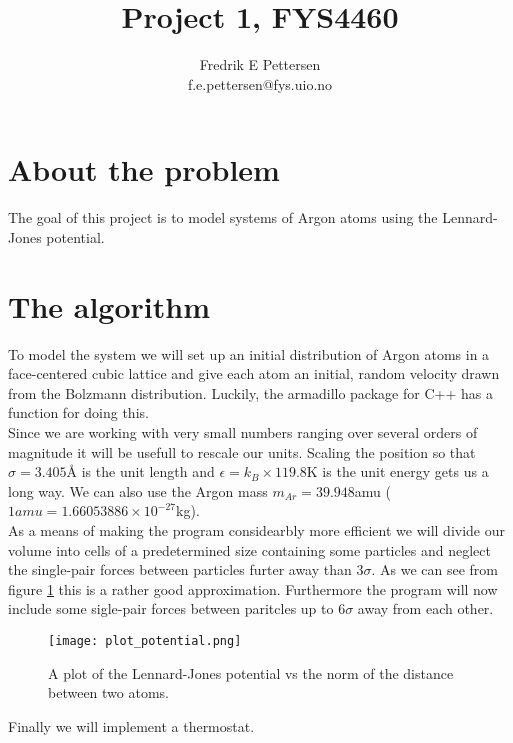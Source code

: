 \documentclass[a4paper,english, 10pt, twoside]{article}
\title{Project 1, FYS4460}
\author{Fredrik E Pettersen\\ f.e.pettersen@fys.uio.no}
\begin{document}
\maketitle

\newpage
\tableofcontents
\newpage


\section{About the problem}
The goal of this project is to model systems of Argon atoms using the Lennard-Jones potential. 

\section{The algorithm}
To model the system we will set up an initial distribution of Argon atoms in a face-centered 
cubic lattice and give each atom an initial, random velocity drawn from the Bolzmann distribution. 
Luckily, the armadillo package for C++ has a function for doing this. \\
Since we are working with very small numbers ranging over several orders of magnitude it will 
be usefull to rescale our units. Scaling the position so that $\sigma = 3.405$Å is the unit 
length and $\epsilon = k_B\times119.8$K is the unit energy gets us a long way. We can also 
use the Argon mass $m_{Ar} = 39.948$amu ($1amu = 1.66053886 \times10^{-27}$kg).\\
As a means of making the program considearbly more efficient we will divide our volume into 
cells of a predetermined size containing some particles and neglect the single-pair 
forces between particles furter away than $3\sigma$. As we can see from figure \ref{potential} 
this is a rather good approximation. Furthermore the program will now include some sigle-pair 
forces between paritcles up to $6\sigma$ away from each other. \\
\begin{figure}[H]
\centering
\texttt{[image: plot\_potential.png]}
\caption{A plot of the Lennard-Jones potential vs the norm of the distance between two atoms.}
\label{potential}
\end{figure}
Finally we will implement a thermostat.
\end{document}
